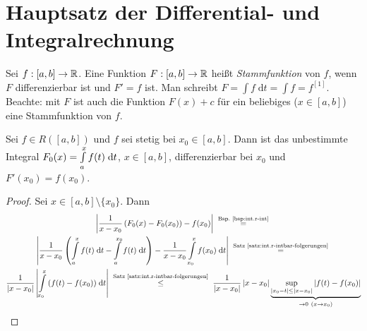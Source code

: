 \documentclass[12pt]{scrreprt}
\begin{document}
\section{Hauptsatz der Differential- und Integralrechnung}
\label{sec:int.hs-diff-int}

\begin{dfn}
  \label{dfn:int.stammfkt}
  Sei $f: [a,b] \rightarrow \mathbb{R}$. Eine Funktion $F: [a,b]
  \rightarrow \mathbb{R}$ heißt \emph{Stammfunktion} von $f$, wenn $F$
  differenzierbar ist und $F'=f$ ist. Man schreibt
  $F=\int{f\;\mathrm{d}t}=\int{f}=f^{[1]}$. Beachte: mit $F$ ist auch
  die Funktion $F(x)+c$ für ein beliebiges  ($x\in[a,b]$)
  eine Stammfunktion von $f$.
\end{dfn}

\begin{lem}
  \label{lem:int.integral-stammfkt}
  Sei $f\in R([a,b])$ und $f$ sei stetig bei $x_0\in[a,b]$. Dann ist
  das unbestimmte Integral $F_0(x)=\int\limits_{a}^{x}{f(t)}\;\mathrm{d}t$,
  $x\in[a,b]$, differenzierbar bei $x_0$ und $F'(x_0)=f(x_0)$.
\end{lem}
\begin{proof}
  Sei $x\in[a,b]\setminus\{x_0\}$. Dann
  \begin{multline*}
    \abs{\frac{1}{x-x_0}\left(F_0(x)-F_0(x_0)\right)-f(x_0)}
    \nach{=}{Bsp.~\ref{bsp:int.r-int}}\\
    \abs{\frac{1}{x-x_0}\left(\Integral{a}{x}{f(t)}{t}-\Integral{a}{x_0}{f(t)}{t}\right)
      - \frac{1}{x-x_0}\Integral{x_0}{x}{f(x_0)}{t}}
    \nach{=}{Satz~\ref{satz:int.r-intbar-folgerungen}}\\
    \frac{1}{\abs{x-x_0}}
    \abs{\Integral{x_0}{x}{\left(f(t)-f(x_0)\right)}{t}}
    \nach{\le}{Satz~\ref{satz:int.r-intbar-folgerungen}}
    \frac{1}{\abs{x-x_0}} \abs{x-x_0} \underbrace{\sup_{\abs{x_0-t}\le\abs{x-x_0}}{\abs{f(t)-f(x_0)}}}_{\to 0\ (x\to x_0)}
  \end{multline*}
\end{proof}
\end{document}
